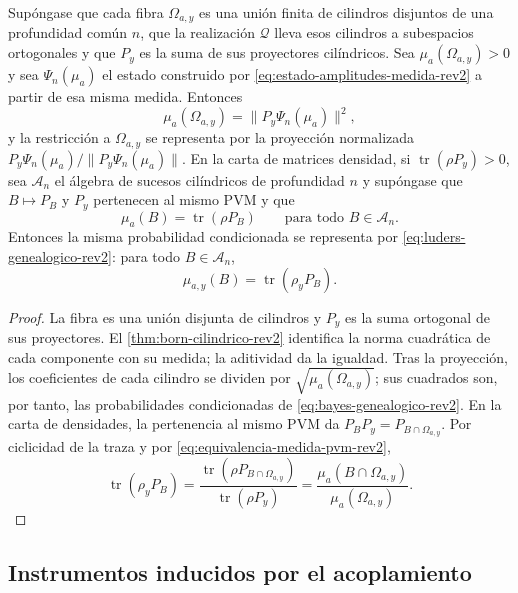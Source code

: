 \begin{theorem}
\label{thm:fibra-proyeccion-medida-rev2}
Supóngase que cada fibra \(\Omega_{a,y}\) es una unión finita de cilindros
disjuntos de una profundidad común \(n\), que la realización
\(\mathcal Q\) lleva esos cilindros a subespacios ortogonales y que \(P_y\)
es la suma de sus proyectores cilíndricos. Sea
\(\mu_a(\Omega_{a,y})>0\) y sea \(\Psi_n(\mu_a)\) el estado construido por
\eqref{eq:estado-amplitudes-medida-rev2} a partir de esa misma medida. Entonces
\[
 \mu_a(\Omega_{a,y})=\|P_y\Psi_n(\mu_a)\|^2,
\]
y la restricción a \(\Omega_{a,y}\) se representa por la proyección
normalizada
\(P_y\Psi_n(\mu_a)/\|P_y\Psi_n(\mu_a)\|\). En la carta de matrices
densidad, si
\(\operatorname{tr}(\rho P_y)>0\), sea \(\mathcal A_n\) el álgebra de
sucesos cilíndricos de profundidad \(n\) y supóngase que \(B\mapsto P_B\) y
\(P_y\) pertenecen al mismo PVM y que
\begin{equation}
 \mu_a(B)=\operatorname{tr}(\rho P_B)
 \qquad\text{para todo }B\in\mathcal A_n.
 \label{eq:equivalencia-medida-pvm-rev2}
\end{equation}
Entonces la misma probabilidad condicionada se representa por
\eqref{eq:luders-genealogico-rev2}: para todo \(B\in\mathcal A_n\),
\[
 \mu_{a,y}(B)=\operatorname{tr}(\rho_yP_B).
\]
\end{theorem}

\begin{proof}
La fibra es una unión disjunta de cilindros y \(P_y\) es la suma ortogonal de
sus proyectores. El \cref{thm:born-cilindrico-rev2} identifica la norma
cuadrática de cada componente con su medida; la aditividad da la igualdad.
Tras la proyección, los coeficientes de cada cilindro se dividen por
\(\sqrt{\mu_a(\Omega_{a,y})}\); sus cuadrados son, por tanto, las
probabilidades condicionadas de \eqref{eq:bayes-genealogico-rev2}.
En la carta de densidades, la pertenencia al mismo PVM da
\(P_BP_y=P_{B\cap\Omega_{a,y}}\). Por ciclicidad de la traza y por
\eqref{eq:equivalencia-medida-pvm-rev2},
\[
 \operatorname{tr}(\rho_yP_B)
 =\frac{\operatorname{tr}(\rho P_{B\cap\Omega_{a,y}})}
        {\operatorname{tr}(\rho P_y)}
 =\frac{\mu_a(B\cap\Omega_{a,y})}{\mu_a(\Omega_{a,y})}.
\]
\end{proof}

\subsection{Instrumentos inducidos por el acoplamiento}


